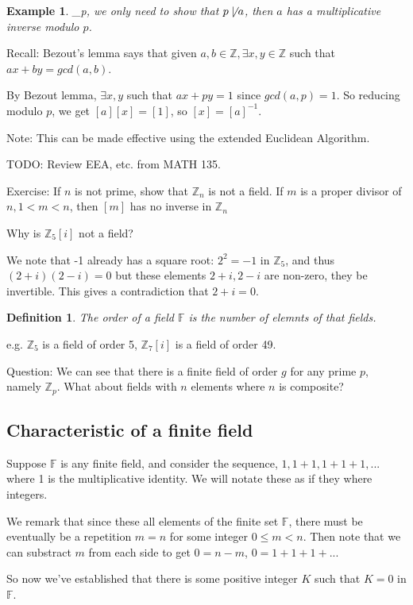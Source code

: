 \documentclass{article}
\newtheorem{defn}{Definition}
\newtheorem{eg}{Example}
\begin{document}
\begin{eg}
    _p, we only need to show that $p\not\mid a$, then $a$ has a multiplicative
    inverse modulo $p$.
\end{eg}

Recall: Bezout's lemma says that given $a,b\in\mathbb{Z}, \exists x,y\in\mathbb{Z}$
such that $ax + by = gcd(a,b)$.

By Bezout lemma, $\exists x,y$ such that $ax + py = 1$ since $gcd(a, p) = 1$. So
reducing modulo $p$, we get $[a][x] = [1]$, so $[x] = [a]^{-1}$.

Note: This can be made effective using the extended Euclidean Algorithm.

TODO: Review EEA, etc. from MATH 135.

Exercise: If $n$ is not prime, show that $\mathbb{Z}_n$ is not a field. If $m$ is a
proper divisor of $n, 1 < m < n$, then $[m]$ has no inverse in $\mathbb{Z}_n$

Why is $\mathbb{Z}_5[i]$ not a field?

We note that -1 already has a square root: $2^2 = -1$ in $\mathbb{Z}_5$, and thus
$(2+i)(2-i) = 0$ but these elements $2+i, 2-i$ are non-zero, they be invertible.
This gives a contradiction that $2+i = 0$.

\begin{defn}
    The order of a field $\mathbb{F}$ is the number of elemnts of that fields.
\end{defn}

e.g. $\mathbb{Z}_5$ is a field of order 5, $\mathbb{Z}_7[i]$ is a field of order
49.

Question: We can see that there is a finite field of order $g$ for any prime $p$, namely
$\mathbb{Z}_p$. What about fields with $n$ elements where $n$ is composite?

\subsection{Characteristic of a finite field}
Suppose $\mathbb{F}$ is any finite field, and consider the sequence,
$1, 1+1, 1+1+1,...$  where 1 is the multiplicative identity. We will notate these
as if they where integers.

We remark that since these all elements of the finite set $\mathbb{F}$, there must
be eventually be a repetition $m=n$ for some integer $0\leq m < n$. Then note that
we can substract $m$ from each side to get $0 = n - m$, $0 = 1+1+1+...$

So now we've established that there is some positive integer $K$  such that $K = 0$ in
$\mathbb{F}$.
\end{document}
